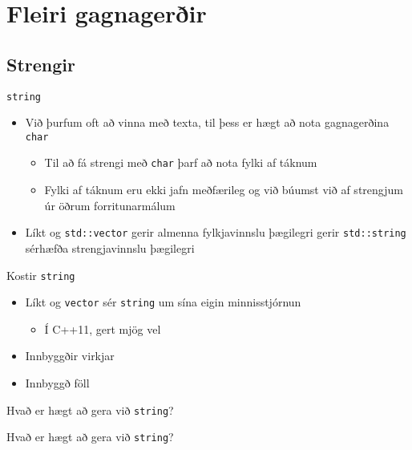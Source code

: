 \documentclass[handout]{beamer}
\begin{document}
\section{Fleiri gagnagerðir}

\subsection{Strengir}

\begin{frame}{\texttt{string}}
\begin{itemize}
 \item Við þurfum oft að vinna með texta, til þess er hægt að nota gagnagerðina \texttt{char}
 \begin{itemize}
  \item Til að fá strengi með \texttt{char} þarf að nota fylki af táknum
  \item Fylki af táknum eru ekki jafn meðfærileg og við búumst við af strengjum úr öðrum forritunarmálum 
 \end{itemize}
 \item Líkt og \texttt{std::vector} gerir almenna fylkjavinnslu þægilegri gerir \texttt{std::string} sérhæfða strengjavinnslu þægilegri
\end{itemize}
\end{frame}

\begin{frame}{Kostir \texttt{string}}
\begin{itemize}
 \item Líkt og \texttt{vector} sér \texttt{string} um sína eigin minnisstjórnun
 \begin{itemize}
  \item Í C++11, gert mjög vel
 \end{itemize}
 \item Innbyggðir virkjar
 \item Innbyggð föll
\end{itemize}
\end{frame}

\begin{frame}{Hvað er hægt að gera við \texttt{string}?}
\end{frame}

\begin{frame}{Hvað er hægt að gera við \texttt{string}?}
\end{frame}
\end{document}
